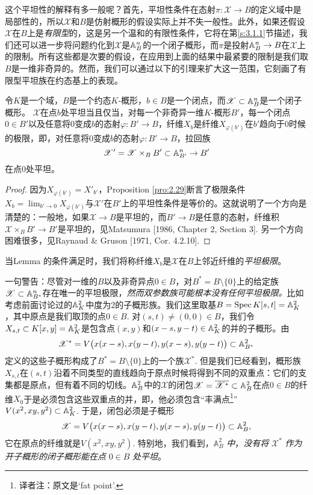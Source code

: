 这个平坦性的解释有多一般呢？首先，平坦性条件在态射$\pi:\mathscr{X}\to B$的定义域\nottran 中是局部性的，所以$\mathscr{X}$和$B$是仿射概形的假设实际上并不失一般性。此外，如果还假设$\mathscr{X}$在$B$上是\textit{有限型}的，这是另一个温和的有限性条件，它将在第\ref{s:3.1.1}节描述，我们还可以进一步将问题约化到$\mathscr{X}$是$\mathbb{A}_B^n$的一个闭子概形，而$\pi$是投射$\mathbb{A}_B^n\to B$在$\mathscr{X}$上的限制。所有这些都是次要的假设，在应用到上面的结果中最紧要的限制是我们取$B$是一维非奇异的。然而，我们可以通过以下的引理来扩大这一范围，它刻画了有限型平坦族在约态基上的表现。

\begin{lem}\label{lem:2.30}
	令$K$是一个域，$B$是一个约态$K$\hyp 概形，$b\in B$是一个闭点，而$\mathscr{X}\subset \mathbb{A}_{B}^n$是一个闭子概形。 $\mathscr{X}$在点$b$处平坦当且仅当，对每一个非奇异一维$K$\hyp 概形$B'$，每一个闭点$0\in B'$以及任意将$0$变成$b$的态射$\varphi:B'\to B$，纤维$X_b$是纤维$X_{\varphi(b')}$在$b'$趋向于$0$时候的极限，即，对任意将$0$变成$b$的态射$\varphi:B'\to B$，拉回族
	\[
	\mathscr{X}'=\mathscr{X}\times_B B'\subset \mathbb{A}_{B'}^n\to B'
	\]
	在点$0$处平坦。
\end{lem}

\begin{proof}
因为$X_{\varphi(b')}=X'_{b'}$，Proposition \ref{pro:2.29}断言了极限条件$X_b=\lim_{b'\to 0}X_{\varphi(b')}$与$\mathscr{X}'$在$B'$上的平坦性条件是等价的。这就说明了一个方向是清楚的：一般地，如果$\mathscr{X}\to B$是平坦的，而$B'\to B$是任意的态射，纤维积$\mathscr{X}\times_B B'\to B'$是平坦的，见Matsumura [1986, Chapter 2, Section 3]. 另一个方向困难很多，见Raynaud \& Gruson [1971, Cor. 4.2.10].
\end{proof}

当Lemma \thethm 的条件满足时，我们将称纤维$X_b$是$\mathscr{X}$在$B$上邻近纤维的\textit{平坦极限}。

一句警告：尽管对一维的$B$以及非奇异点$0\in B$，对$B^*=B\setminus \{0\}$上的给定族$\mathscr{X}\subset \mathbb{A}_{B^*}^n$存在唯一的平坦极限，\textit{然而双参数族可能根本没有任何平坦极限。}比如考虑前面讨论过的$\mathbb{A}_K^2$中度为$2$的子概形族。我们这里取基$B=\operatorname{Spec} K[s,t]=\mathbb{A}_{K}^2$，其中原点是我们取顶的点$0\in B$. 对$(s,t)\neq (0,0)\in B$，我们令$X_{s,t}\subset K[x,y]=\mathbb{A}_K^2$是包含点$(x,y)$和$(x-s,y-t)\in \mathbb{A}_K^2$的并的子概形。由
\[
	\mathscr{X}^*=V\bigl(x(x-s),x(y-t),y(x-s),y(y-t)\bigr)\subset \mathbb{A}_{B^*}^2
\]
定义的这些子概形构成了$B^*=B\setminus \{0\}$上的一个族$\mathscr{X}^*$. 但是我们已经看到，概形族$X_{s,t}$在$(s,t)$沿着不同类型的直线趋向于原点时候将得到不同的双重点：它们的支集都是原点，但有着不同的切线。$\mathbb{A}_B^2$中的$\mathscr{X}$的闭包$\mathscr{X}=\overline{\mathscr{X}^*}\subset \mathbb{A}_B^2$在点$0\in B$的纤维$X_0$于是必须包含这些双重点的并，即，他必须包含“丰满点\footnote{译者注：原文是`fat point'.}”$V(x^2,xy,y^2)\subset \mathbb{A}_K^2$. 于是，闭包必须是子概形
\[
	\mathscr{X}=V\bigl(x(x-s),x(y-t),y(x-s),y(y-t)\bigr)\subset \mathbb{A}_{B}^2,
\]
它在原点的纤维就是$V(x^2,xy,y^2)$. 特别地，我们看到，$\mathbb{A}_B^2$ \textit{中}，\textit{没有将} $\mathscr{X}^*$ {\large\it 作为开子概形的闭子概形能在点} $0\in B$ \textit{处平坦}。

